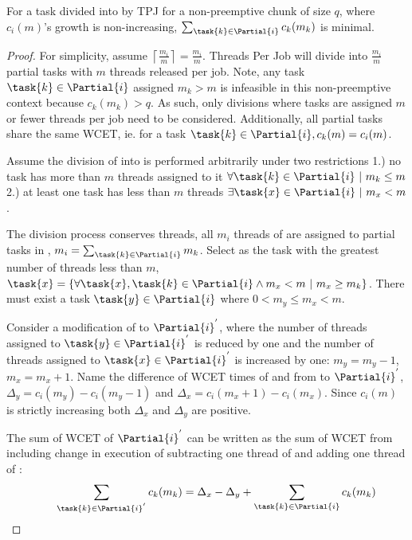\begin{theorem} For a task  divided into  by TPJ for a
  non-preemptive chunk of size ${q}$, where ${c_i(m)}$'s growth
  is non-increasing, ${\sum_{\task{k} \in \Partial{i}} c_k(m_k)}$ is
  minimal. 
  
  \begin{proof} 

    For simplicity, assume ${\left\lceil \frac{m_i}{m}
     \right\rceil = \frac{m_i}{m}}$. Threads Per Job will divide
    into ${\frac{m_i}{m}}$ partial tasks  with ${m}$
   threads released per job. Note, any task
   ${\task{k} \in \Partial{i}}$ assigned ${m_k > m}$ is  
   infeasible in this non-preemptive context because
   ${c_k(m_k) > q}$. As such, only divisions where tasks are assigned
   ${m}$ or fewer threads per job need to be considered. Additionally,
   all partial tasks share the same WCET, ie. for a task
   ${\task{k} \in \Partial{i}, c_k(m) = c_i(m)}$.

   Assume the division of  into  is performed
   arbitrarily under two restrictions 1.) no task has
   more than ${m}$ threads assigned to it
   ${\forall \task{k} \in \Partial{i}~|~ m_k \le m}$ 2.) at least one
   task has less than ${m}$ threads ${\exists \task{x} \in
     \Partial{i}~|~ m_x < m}$.

   The division process conserves threads, all ${m_i}$
   threads of  are assigned to partial tasks in ,
   ${m_i = \sum_{\task{k} \in \Partial{i}} m_k}$. Select  as
   the task with the greatest number of threads less than ${m}$,
   ${\task{x} = \{ \forall \task{x},\task{k} \in \Partial{i} \land m_x
     < m~|~ m_x \ge m_k\}}$. There must exist a task ${\task{y} \in
     \Partial{i}}$ where ${0 < m_y \le m_x < m}$.

   Consider a modification of  to ${\Partial{i}^{'}}$, where the
   number of threads assigned to ${\task{y} \in \Partial{i}^{'}}$ is
   reduced by one and the number of threads assigned to
   ${\task{x} \in \Partial{i}^{'}}$ is increased by one:
   ${m_y = m_y - 1}$, ${m_x = m_x + 1}$. Name the difference of
   WCET times of  and  from  to
   ${\Partial{i}^{'}}$, ${\Delta_y = c_i(m_y) - c_i(m_y - 1)}$ and
   ${\Delta_x = c_i(m_x + 1) - c_i(m_x)}$. Since ${c_i(m)}$ is
   strictly increasing both ${\Delta_x}$ and ${\Delta_y}$ are positive. 

   The sum of WCET of ${\Partial{i}^{'}}$ can be written as the sum of
   WCET from  including change in execution of subtracting
   one thread of  and adding one thread of :
   \begin{equation*}
     \indent
     \sum_{\task{k} \in \Partial{i}^{'}} c_k(m_k) =
     \Delta_x - \Delta_y + \sum_{\task{k} \in \Partial{i}} c_k(m_k) 
   \end{equation*} 


\end{proof}
\end{theorem}
